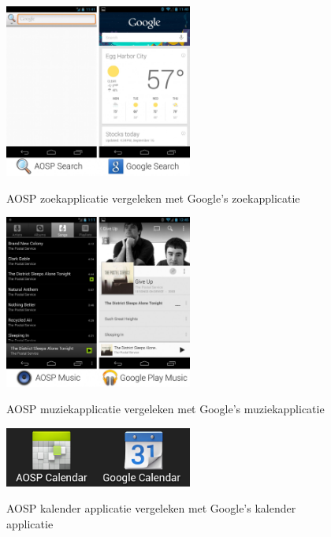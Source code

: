 \begin{figure}
    \centering
    \includegraphics[width=0.55\textwidth]{img/googlesearch.jpg}
    \caption{AOSP zoekapplicatie vergeleken met Google's zoekapplicatie}
    \label{fig:googlesearch}
    \autocite{amadeo_open-source}
\end{figure}

\begin{figure}
    \centering
    \includegraphics[width=0.55\textwidth]{img/googleplaymusic.jpg}
    \caption{AOSP muziekapplicatie vergeleken met Google's muziekapplicatie}
    \label{fig:googleplaymusic}
    \autocite{amadeo_open-source}
\end{figure}

\begin{figure}
    \centering
    \includegraphics[width=0.55\textwidth]{img/googlecalendar.jpg}
    \caption{AOSP kalender applicatie vergeleken met Google's kalender applicatie}
    \label{fig:googlecalendar}
    \autocite{amadeo_open-source}
\end{figure}

